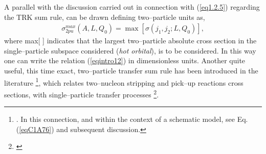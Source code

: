 A parallel with the discussion carried out in connection with (\ref{eq1.2.5}) regarding the TRK sum rule, can be drawn defining two--particle units as,
\begin{align}
\sigma^{max}_{2pu}(A,L,Q_0)=\max \left[\sigma(j_1,j_2;L,Q_0)\right],
\end{align}
where max[ ] indicates that the largest two--particle absolute cross section in the single--particle subspace considered (\textit{hot orbital}), is to be considered. In this way one can write the relation (\ref{eqintro12}) in dimensionless units.  Another quite useful, this time exact, two--particle transfer sum rule has been introduced in the literature \footnote{\cite{Bayman:72}. In this connection, and within the context of a schematic model, see Eq. (\ref{eqC1A76}) and subsequent discussion.}, which relates two--nucleon stripping and pick--up reactions cross sections, with single--particle transfer processes \footnote{\cite{Lanford:77}}.


